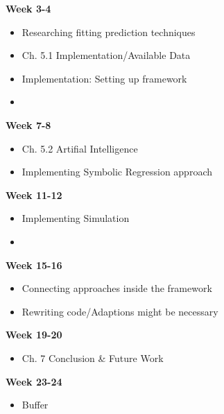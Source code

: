 \documentclass[a4paper,11pt]{article}
\begin{document}
\hfill
\begin{minipage}[t]{.45\textwidth}
    \textbf{Week 3-4}
    \begin{itemize}
        \item Researching fitting prediction techniques
        \item Ch. 5.1 Implementation/Available Data
        \item Implementation: Setting up framework
        \item[]
    \end{itemize}
    \textbf{Week 7-8}
    \begin{itemize}
        \item Ch. 5.2 Artifial Intelligence
        \item Implementing Symbolic Regression approach
    \end{itemize}
    \textbf{Week 11-12}
    \begin{itemize}
        \item Implementing Simulation
        \item[]
    \end{itemize}
    \textbf{Week 15-16}
    \begin{itemize}
        \item Connecting approaches inside the framework
        \item Rewriting code/Adaptions might be necessary
    \end{itemize}
    \textbf{Week 19-20}
    \begin{itemize}
        \item Ch. 7 Conclusion \& Future Work
    \end{itemize}
    \textbf{Week 23-24}
    \begin{itemize}
        \item Buffer
    \end{itemize}
\end{minipage}
\end{document}
